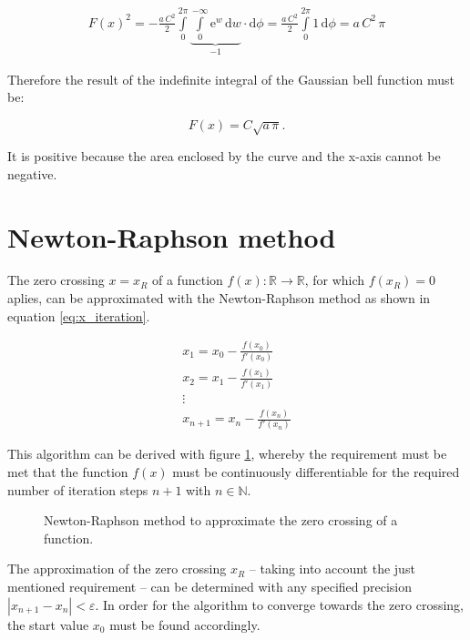 \begin{center}
	\begin{equation} \label{eq:integral_gauss_solved}
		\begin{split}
		F\left(x\right)^2 = -\frac{a \, C^2}{2}\int\limits_{0}^{2\pi} \underbrace{\int\limits_{0}^{-\infty} \mathrm{e}^w \,\mathrm{d}w}_{-1} \cdot \mathrm{d}\phi = \frac{a \, C^2}{2}\int\limits_{0}^{2\pi} 1 \, \mathrm{d}\phi = a \, C^2 \, \pi
		\end{split}
	\end{equation}
\end{center}
Therefore the result of the indefinite integral of the Gaussian bell function must be:
\begin{center}
	\begin{equation} \label{eq:lim_r}
		F(x) = C \sqrt{a \, \pi} \text{.}
	\end{equation}
\end{center}
It is positive because the area enclosed by the curve and the x-axis cannot be negative. 


\section{Newton-Raphson method} \label{sec:newton_raphson_method}
The zero crossing $x = x_R$ of a function $f\left( x \right) : \mathbb{R} \to \mathbb{R}$, for which $f\left( x_R \right) = 0$ aplies, can be approximated with the Newton-Raphson method as shown in equation \ref{eq:x_iteration}.
\begin{center}
	\begin{equation} \label{eq:x_iteration}
		\begin{gathered}
			x_1 = x_0 - \frac{f\left( x_0 \right)}{f'\left( x_0 \right)} \\
			x_2 = x_1 - \frac{f\left( x_1 \right)}{f'\left( x_1 \right)} \\
			\vdots \\
			x_{n + 1} = x_n - \frac{f\left( x_n \right)}{f'\left( x_n \right)}
		\end{gathered}
	\end{equation}
\end{center}
This algorithm can be derived with figure \ref{fig:tikz_newton_method}, whereby the requirement must be met that the function $f\left( x \right)$ must be continuously differentiable for the required number of iteration steps $n + 1$ with $n \in \mathbb{N}$.
\begin{figure}[h!]
	\centering
	
	\caption{Newton-Raphson method to approximate the zero crossing of a function.}
	\label{fig:tikz_newton_method}
\end{figure}
The approximation of the zero crossing $x_R$ -- taking into account the just mentioned requirement -- can be determined with any specified precision $\left| x_{n + 1} - x_n \right| < \varepsilon$. In order for the algorithm to converge towards the zero crossing, the start value $x_0$ must be found accordingly.

